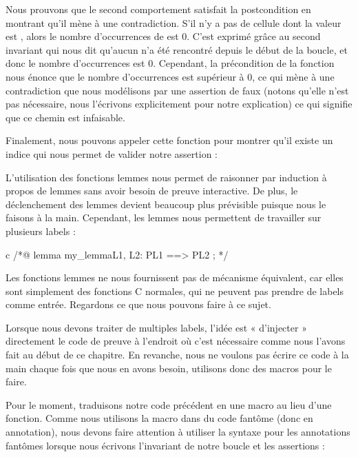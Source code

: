 Nous prouvons que le second comportement satisfait la postcondition en montrant
qu'il mène à une contradiction. S'il n'y a pas de cellule dont la valeur est
, alors le nombre d'occurrences de  est 0. C'est
exprimé grâce au second invariant qui nous dit qu'aucun  n'a été
rencontré depuis le début de la boucle, et donc le nombre d'occurrences est 0.
Cependant, la précondition de la fonction nous énonce que le nombre d'occurrences
est supérieur à 0, ce qui mène à une contradiction que nous modélisons par une
assertion de faux (notons qu'elle n'est pas nécessaire, nous l'écrivons
explicitement pour notre explication) ce qui signifie que ce chemin est
infaisable.


Finalement, nous pouvons appeler cette fonction pour montrer qu'il existe un
indice qui nous permet de valider notre assertion :




L'utilisation des fonctions lemmes nous permet de raisonner par
induction à propos de lemmes sans avoir besoin de preuve interactive. De plus,
le déclenchement des lemmes devient beaucoup plus prévisible puisque nous le
faisons à la main. Cependant, les lemmes nous permettent de travailler sur
plusieurs labels :



\begin{CodeBlock}{c}
/*@
  lemma my_lemma{L1, L2}:  P{L1} ==> P{L2} ;
*/
\end{CodeBlock}


Les fonctions lemmes ne nous fournissent pas de mécanisme équivalent,
car elles sont simplement des fonctions C normales, qui ne peuvent pas prendre
de labels comme entrée. Regardons ce que nous pouvons faire à ce sujet.





Lorsque nous devons traiter de multiples labels, l'idée est « d'injecter »
directement le code de preuve à l'endroit où c'est nécessaire comme nous
l'avons fait au début de ce chapitre. En revanche, nous ne voulons pas écrire
ce code à la main chaque fois que nous en avons besoin, utilisons donc des
macros pour le faire.


Pour le moment, traduisons notre code précédent en une macro au lieu d'une
fonction. Comme nous utilisons la macro dans du code fantôme (donc en annotation),
nous devons faire attention à utiliser la syntaxe pour les annotations fantômes
lorsque nous écrivons l'invariant de notre boucle et les assertions :



